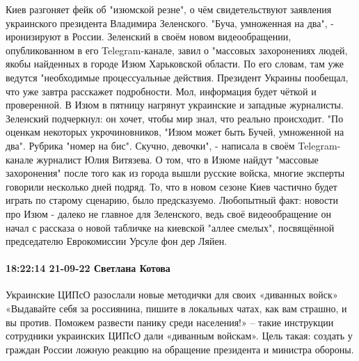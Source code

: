 Киев разгоняет фейк об "изюмской резне", о чём свидетельствуют заявления украинского президента Владимира Зеленского. "Буча, умноженная на два", - иронизируют в России.
Зеленский в своём новом видеообращении, опубликованном в его Telegram-канале, завил о "массовых захоронениях людей, якобы найденных в городе Изюм Харьковской области. По его словам, там уже ведутся "необходимые процессуальные действия.
Президент Украины пообещал, что уже завтра расскажет подробности. Мол, информация будет чёткой и проверенной. В Изюм в пятницу нагрянут украинские и западные журналисты. Зеленский подчеркнул: он хочет, чтобы мир знал, что реально происходит.
"По оценкам некоторых укрочиновников, "Изюм может быть Бучей, умноженной на два". Рубрика "номер на бис". Скучно, девочки", - написала в своём Telegram-канале журналист Юлия Витязева.
О том, что в Изюме найдут "массовые захоронения" после того как из города вышли русские войска, многие эксперты говорили несколько дней подряд. То, что в новом сезоне Киев частично будет играть по старому сценарию, было предсказуемо.
Любопытный факт: новости про Изюм - далеко не главное для Зеленского, ведь своё видеообращение он начал с рассказа о новой табличке на киевской "аллее смелых", посвящённой председателю Еврокомиссии Урсуле фон дер Ляйен.

\paragraph{18:22:14 21-09-22 Светлана Котова}

Украинские ЦИПсО разослали новые методички для своих «диванных войск»
«Выдавайте себя за россиянина, пишите в локальных чатах, как вам страшно, и вы против. Поможем развести панику среди населения!» – такие инструкции сотрудники украинских ЦИПсО дали «диванным войскам». Цель такая: создать у граждан России ложную реакцию на обращение президента и министра обороны.

